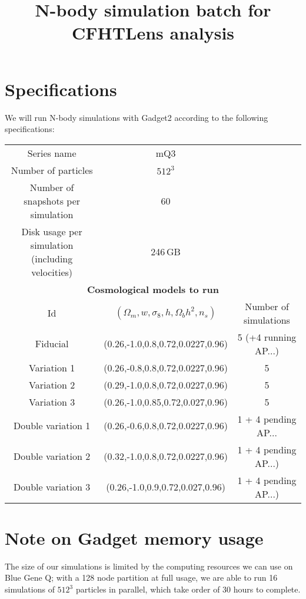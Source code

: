 \documentclass[11pt]{article}
\begin{document}
\title{N-body simulation batch for CFHTLens analysis}
\author{}
\date{}

\maketitle

\section*{Specifications}

We will run N-body simulations with Gadget2 according to the following specifications:

\begin{table}[h!]
\begin{center}
\begin{tabular}{ccc} \hline
Series name & mQ3 & \\
Number of particles & $512^3$ & \\ 
Number of snapshots per simulation & 60 & \\
Disk usage per simulation (including velocities) & 246\,GB& \\ \hline
\multicolumn{3}{c}{\textbf{Cosmological models to run}} \\
Id & $(\Omega_m,w,\sigma_8,h,\Omega_bh^2,n_s)$ & Number of simulations\\ \hline
Fiducial & (0.26,-1.0,0.8,0.72,0.0227,0.96) & 5 (+4 running AP...) \\
Variation 1 & (0.26,-0.8,0.8,0.72,0.0227,0.96) & 5 \\
Variation 2 & (0.29,-1.0,0.8,0.72,0.0227,0.96) & 5 \\
Variation 3 & (0.26,-1.0,0.85,0.72,0.027,0.96) & 5 \\ \hline
Double variation 1 & (0.26,-0.6,0.8,0.72,0.0227,0.96) & 1 + 4 pending AP... \\
Double variation 2 & (0.32,-1.0,0.8,0.72,0.0227,0.96) & 1 + 4 pending AP...) \\
Double variation 3 & (0.26,-1.0,0.9,0.72,0.027,0.96) & 1 + 4 pending AP...) \\ \hline
\end{tabular}
\end{center}
\end{table}

\section*{Note on Gadget memory usage}
The size of our simulations is limited by the computing resources we can use on Blue Gene Q; with a 128 node partition at full usage, we are able to run 16 simulations of $512^3$ particles in parallel, which take order of 30 hours to complete. 
\end{document}
